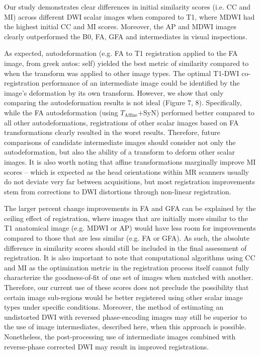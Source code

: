 Our study demonstrates clear differences in initial similarity scores (i.e. CC and MI) across different DWI scalar images when compared to T1, where MDWI had the highest initial CC and MI scores.  Moreover, the AP and MDWI images clearly outperformed the B0, FA, GFA and intermediates in visual inspections.

As expected, autodeformation (e.g. FA to T1 registration applied to the FA image, from greek autos: self) yielded the best metric of similarity compared to when the transform was applied to other image types. The optimal T1-DWI co-registration performance of an intermediate image could be identified by the image’s deformation by its own transform. However, we show that only comparing the autodeformation results is not ideal (Figure 7, 8). Specifically, while the FA autodeformation (using $T_{\text{Affine}}$+SyN) performed better compared to all other autodeformations, registrations of other scalar images based on FA transformations clearly resulted in the worst results. Therefore, future comparisons of candidate intermediate images should consider not only the autodeformation, but also the ability of a transform to deform other scalar images. It is also worth noting that affine transformations marginally improve MI scores – which is expected as the head orientations within MR scanners usually do not deviate very far between acquisitions, but most registration improvements stem from corrections to DWI distortions through non-linear registration.

The larger percent change improvements in FA and GFA can be explained by the ceiling effect of registration, where images that are initially more similar to the T1 anatomical image (e.g. MDWI or AP) would have less room for improvements compared to those that are less similar (e.g. FA or GFA). As such, the absolute difference in similarity scores should still be included in the final assessment of registration. It is also important to note that computational algorithms using CC and MI as the optimization metric in the registration process itself cannot fully characterize the goodness-of-fit of one set of images when matched with another. Therefore, our current use of these scores does not preclude the possibility that certain image sub-regions would be better registered using other scalar image types under specific conditions. Moreover, the method of estimating an undistorted DWI with reversed phase-encoding images may still be superior to the use of image intermediates, described here, when this approach is possible. Nonetheless, the post-processing use of intermediate images combined with reverse-phase corrected DWI may result in improved registrations.

